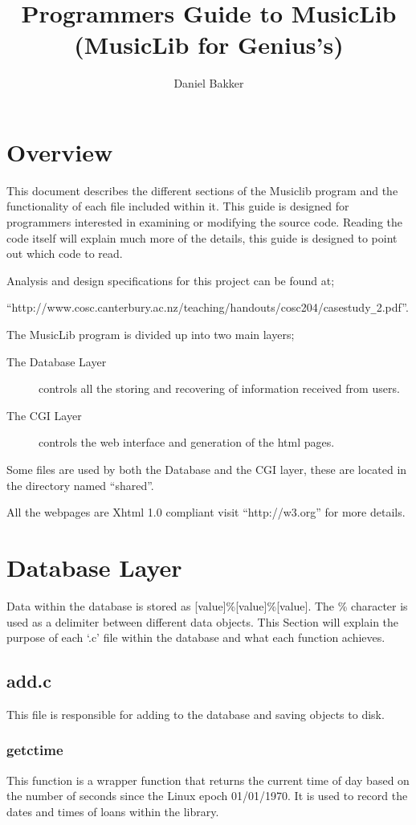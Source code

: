 \documentclass{article}
\title{Programmers Guide to MusicLib (MusicLib for Genius's)}
\author{Daniel Bakker}
\begin{document}
\maketitle
\tableofcontents
\newpage
\section{Overview}
This document describes the different sections of the Musiclib program and the functionality of each file included within it. This guide is designed for programmers interested in examining or modifying the source code. Reading the code itself will explain much more of the details, this guide is designed to point out which code to read.

Analysis and design specifications for this project can be found at;

``http://www.cosc.canterbury.ac.nz/teaching/handouts/cosc204/casestudy\verb|_|2.pdf''.

The MusicLib program is divided up into two main layers;
\begin{description} 
\item[The Database Layer] controls all the storing and recovering of information received from users.
\item[The CGI Layer] controls the web interface and generation of the html pages.
\end{description}

Some files are used by both the Database and the CGI layer, these are located in the directory named ``shared''.

All the webpages are Xhtml 1.0 compliant visit ``http://w3.org'' for more details.

\section{Database Layer}
Data within the database is stored as [value]\%[value]\%[value]. The \% character is used as a delimiter between different data objects. This Section will explain the purpose of each `.c' file within the database and what each function achieves.
\subsection{add.c}
This file is responsible for adding to the database and saving objects to disk.

\subsubsection*{getctime}
 This function is a wrapper function that returns the current time of day based on the number of seconds since the Linux epoch 01/01/1970. It is used to record the dates and times of loans within the library.
\end{document}
